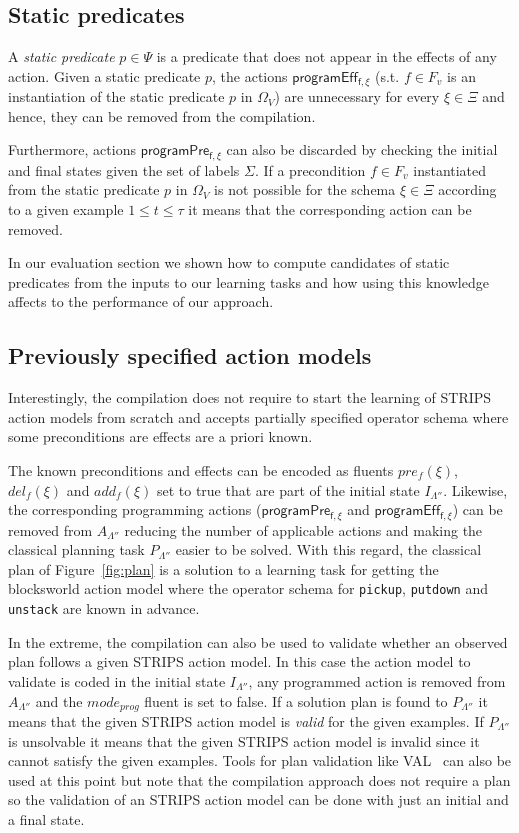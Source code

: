 \documentclass[letterpaper]{article} %
\begin{document}
\subsection{Static predicates}
A {\em static predicate} $p \in \Psi$ is a predicate that does not appear in the effects of any action. Given a static predicate $p$, the actions $\mathsf{programEff_{f,\xi}}$ (s.t. $f\in F_v$ is an instantiation of the static predicate $p$ in $\Omega_V$) are unnecessary for every $\xi\in\Xi$ and hence, they can be removed from the compilation.

Furthermore, actions $\mathsf{programPre_{f,\xi}}$ can also be discarded by checking the initial and final states given the set of labels $\Sigma$. If a precondition $f\in F_v$ instantiated from the static predicate $p$ in $\Omega_V$ is not possible for the schema $\xi\in\Xi$ according to a given example {\small $1\leq t\leq \tau$} it means that the corresponding action can be removed.

In our evaluation section we shown how to compute candidates of static predicates from the inputs to our learning tasks and how using this knowledge affects to the performance of our approach. 

\subsection{Previously specified action models}
Interestingly, the compilation does not require to start the learning of STRIPS action models from scratch and accepts partially specified operator schema where some preconditions are effects are a priori known.

The known preconditions and effects can be encoded as fluents $pre_f(\xi)$, $del_f(\xi)$ and $add_f(\xi)$ set to true that are part of the initial state $I_{\Lambda''}$. Likewise, the corresponding programming actions ($\mathsf{programPre_{f,\xi}}$ and $\mathsf{programEff_{f,\xi}}$) can be removed from $A_{\Lambda''}$ reducing the number of applicable actions  and making the classical planning task $P_{\Lambda''}$ easier to be solved. With this regard, the classical plan of Figure~\ref{fig:plan} is a solution to a learning task for getting the blocksworld action model where the operator schema for {\tt\small pickup}, {\tt\small putdown} and {\tt\small unstack} are known in advance. 

In the extreme, the compilation can also be used to validate whether an observed plan follows a given STRIPS action model. In this case the action model to validate is coded in the initial state $I_{\Lambda''}$, any programmed action is removed from $A_{\Lambda''}$ and the $mode_{prog}$ fluent is set to false. If a solution plan is found to $P_{\Lambda''}$ it means that the given STRIPS action model is {\em valid} for the given examples. If $P_{\Lambda''}$ is unsolvable it means that the given STRIPS action model is invalid since it cannot satisfy the given examples. Tools for plan validation like VAL~\cite{howey2004val} can also be used at this point but note that the compilation approach does not require a plan so the validation of an STRIPS action model can be done with just an initial and a final state.
\end{document}
